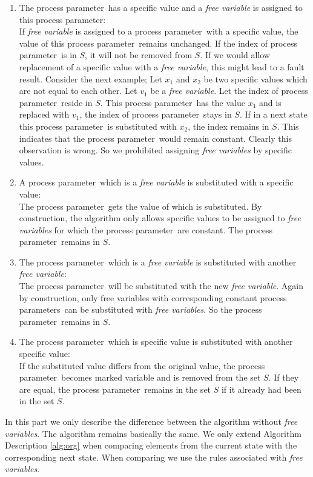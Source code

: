 \index{}\documentclass[a4paper,10pt]{article}
\theoremstyle{plain}
\theoremstyle{definition}
\newcommand{\pp}{process parameter}
\newcommand{\pps}{process parameters}
\newcommand{\ti}{\textit}
\begin{document}
\begin{enumerate}
\item The \pp\ has a specific value and a \ti{free variable} is assigned to this \pp :\\
If \ti{free variable} is assigned to a \pp\ with a specific value, the value of this \pp\ remains unchanged. If the index of \pp\ is in $S$, it will not be removed from $S$. If we would allow replacement of a specific value with a \ti{free variable}, this might lead to a fault result. Consider the next example; Let $x_1$ and $x_2$ be two specific values which are not equal to each other. Let $v_1$ be a \ti{free variable}. Let the index of \pp\ reside in $S$. This \pp\ has the value $x_1$ and is replaced with $v_1$, the index of \pp\ stays in $S$. If in a next state this \pp\ is substituted with $x_2$, the index remains in $S$. This indicates that the \pp\ would remain constant. Clearly this observation is wrong. So we prohibited assigning \ti{free variables} by specific values.

\item A \pp\ which is a \ti{free variable} is substituted with a specific value:\\
The \pp\ gets the value of which is substituted. By construction, the algorithm only allows specific values to be assigned to \ti{free variables} for which the \pp\ are constant. The \pp\ remains in $S$.

\item The \pp\ which is a \ti{free variable} is substituted with another \ti{free variable}:\\
The \pp\ will be substituted with the new \ti{free variable}. Again by construction, only free variables with corresponding constant \pps\ can be substituted with \ti{free variables}. So the \pp\ remains in $S$.

\item The \pp\ which is specific value is substituted with another specific value:\\
If the substituted value differs from the original value, the \pp\ becomes marked variable and is removed from the set $S$.
If they are equal, the \pp\ remains in the set $S$ if it already had been in the set $S$.
\end{enumerate}

In this part we only describe the difference between the algorithm without \ti{free variables}. The algorithm remains basically the same. We only extend Algorithm Description \ref{alg:org} when comparing elements from the current state with the corresponding next state. When comparing we use the rules associated with \ti{free variables}.
\end{document}
